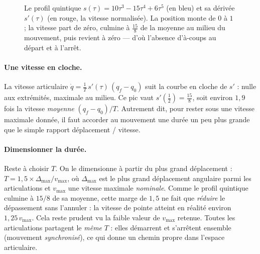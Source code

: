 \begin{figure}[t]
  \centering
  \caption{Le profil quintique $s(\tau) = 10\tau^3 - 15\tau^4 + 6\tau^5$ (en bleu) et sa dérivée $s'(\tau)$ (en rouge, la vitesse normalisée). La position monte de $0$ à $1$ ; la vitesse part de zéro, culmine à $\tfrac{15}{8}$ de la moyenne au milieu du mouvement, puis revient à zéro --- d'où l'absence d'à-coups au départ et à l'arrêt.}
  \label{fig:quintique}
\end{figure}

\paragraph{Une vitesse en cloche.} La vitesse articulaire $\dot{q} = \tfrac{1}{T}\,s'(\tau)\,(q_f - q_0)$ suit la courbe en cloche de $s'$ : nulle aux extrémités, maximale au milieu. Ce pic vaut $s'(\tfrac{1}{2}) = \tfrac{15}{8}$, soit environ $1{,}9$ fois la vitesse \emph{moyenne} $(q_f - q_0)/T$. Autrement dit, pour rester sous une vitesse maximale donnée, il faut accorder au mouvement une durée un peu plus grande que le simple rapport déplacement / vitesse.

\paragraph{Dimensionner la durée.} Reste à choisir $T$. On le dimensionne à partir du plus grand déplacement : $T = 1{,}5 \times \Delta_{\max} / v_{\max}$, où $\Delta_{\max}$ est le plus grand déplacement angulaire parmi les articulations et $v_{\max}$ une vitesse maximale \emph{nominale}. Comme le profil quintique culmine à $15/8$ de sa moyenne, cette marge de $1{,}5$ ne fait que \emph{réduire} le dépassement sans l'annuler : la vitesse de pointe atteint en réalité environ $1{,}25\,v_{\max}$. Cela reste prudent vu la faible valeur de $v_{\max}$ retenue. Toutes les articulations partagent le \emph{même} $T$ : elles démarrent et s'arrêtent ensemble (mouvement \emph{synchronisé}), ce qui donne un chemin propre dans l'espace articulaire.

